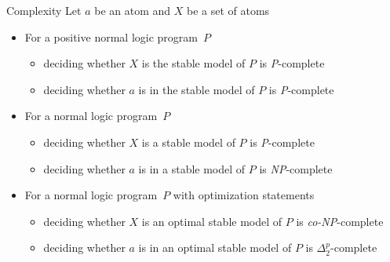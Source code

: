 \begin{frame}{Complexity}
Let $a$ be an atom and $X$ be a set of atoms
\smallskip
\begin{itemize}
\item<2-> For a positive normal logic program~$P$
  \begin{itemize}
  \item deciding whether $X$ is the stable model of $P$ is \textit{P}-complete
  \item deciding whether $a$ is in the stable model of $P$ is \textit{P}-complete
  \end{itemize}
  \smallskip
\item<3-> For a normal logic program~$P$
  \begin{itemize}
  \item deciding whether $X$ is a stable model of $P$ is \textit{P}-complete
  \item deciding whether $a$ is in a stable model of $P$ is \textit{NP}-complete
  \end{itemize}
  \smallskip
\item<4-> For a normal logic program~$P$ with optimization statements
  \begin{itemize}
  \item deciding whether $X$ is an optimal stable model of $P$ is \textit{co-NP}-complete
  \item deciding whether $a$ is in an optimal stable model of $P$ is $\Delta^p_2$-complete
  \end{itemize}
\end{itemize}
\end{frame}
